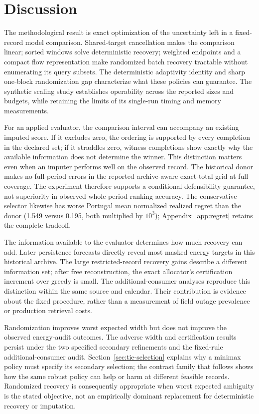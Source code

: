 \documentclass[12pt]{article}
\begin{document}
\section{Discussion}
The methodological result is exact optimization of the uncertainty left in
a fixed-record model comparison. Shared-target cancellation makes the
comparison linear; sorted windows solve deterministic recovery; weighted
endpoints and a compact flow representation make randomized batch recovery
tractable without enumerating its query subsets. The deterministic adaptivity
identity and sharp one-block randomization gap characterize what these
policies can guarantee. The synthetic scaling study establishes operability
across the reported sizes and budgets, while retaining the limits of its
single-run timing and memory measurements.

For an applied evaluator, the comparison interval can accompany an existing
imputed score. If it excludes zero, the ordering is supported by every
completion in the declared set; if it straddles zero, witness completions
show exactly why the available information does not determine the winner.
This distinction matters even when an imputer performs well on the observed
record. The historical donor makes no full-period errors in the reported
archive-aware exact-total grid at full coverage. The experiment therefore
supports a conditional defensibility guarantee, not superiority in observed
whole-period ranking accuracy. The conservative selector likewise has worse
Portugal mean normalized realized regret than the donor (1.549 versus 0.195,
both multiplied by $10^3$); Appendix~\ref{app:regret} retains the complete
tradeoff.

The information available to the evaluator determines how much recovery
can add. Later persistence forecasts directly reveal most masked energy
targets in this historical archive. The large restricted-record recovery
gains describe a different information set; after free reconstruction,
the exact allocator's certification increment over greedy is small.
The additional-consumer analyses reproduce this distinction within the
same source and calendar. Their contribution is evidence about the fixed
procedure, rather than a measurement of field outage prevalence or
production retrieval costs.

Randomization improves worst expected width but does not improve the
observed energy-audit outcomes. The adverse width and certification results
persist under the two specified secondary refinements and the fixed-rule
additional-consumer audit. Section~\ref{sec:tie-selection} explains why a
minimax policy must specify its secondary selection; the contrast family
that follows shows how the same robust policy can help or harm at different
feasible records. Randomized recovery is consequently appropriate when
worst expected ambiguity is the stated objective, not an empirically
dominant replacement for deterministic recovery or imputation.
\end{document}
